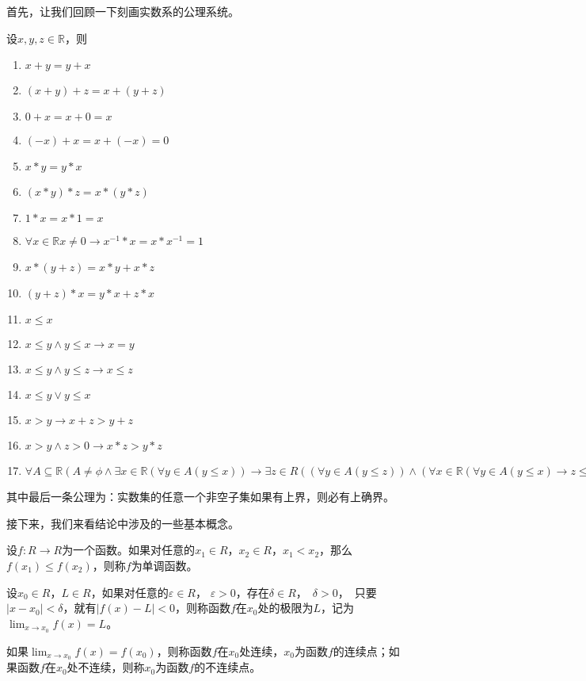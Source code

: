 

首先，让我们回顾一下刻画实数系的公理系统。

     设$x, y, z \in \mathbb{R}$，则
   \begin{enumerate}
   \item   $x + y = y + x$
   \item   $(x + y) + z = x + (y + z)$
   \item   $0 + x = x + 0 = x$
   \item   $(-x) + x = x + (-x) = 0$
   \item   $x * y = y * x$
   \item   $(x * y) * z = x * (y *z)$
   \item   $1 * x = x * 1 = x$
   \item   $\forall x \in \mathbb{R} x \neq 0 \to x^{-1} * x = x * x^{-1} = 1$
   \item   $x* (y + z) = x * y + x * z$
   \item   $(y + z) * x = y * x + z * x$
       \item $x \leq x$
   \item $ x \leq y \land y \leq x \rightarrow x = y$
   \item $x \leq y \land y \leq z \rightarrow x \leq z$
   \item $x \leq y \lor y \leq x$ 
\item $x > y \rightarrow x + z > y + z$
\item $x > y \land z >0 \rightarrow x * z > y * z$
\item   $\forall A \subseteq \mathbb{R} (A \neq \phi \land \exists x \in \mathbb{R} (\forall y \in A (y \leq x)) \rightarrow \exists z \in R ((\forall y \in A (y \leq z) )\land ( \forall x \in \mathbb{R} (\forall y \in A (y \leq x) \rightarrow z \leq x))))$   
    \end{enumerate}

其中最后一条公理为：实数集的任意一个非空子集如果有上界，则必有上确界。

接下来，我们来看结论中涉及的一些基本概念。

设$f:R\to R$为一个函数。如果对任意的$x_1\in R$，$x_2\in R$，$x_1< x_2$，那么$f(x_1) \leq f(x_2)$，则称$f$为单调函数。

设$x_0\in R$，$L\in R$，如果对任意的$\varepsilon\in R$， $\varepsilon> 0$，存在$\delta \in R$，　$\delta > 0$，　只要$|x-x_0|<\delta$，就有$|f(x) - L|<0$，则称函数$f$在$x_0$处的极限为$L$，记为$\lim_{x\to x_0}f(x)=L$。

如果$\lim_{x\to x_0}f(x)=f(x_0)$，则称函数$f$在$x_0$处连续，$x_0$为函数$f$的连续点；如果函数$f$在$x_0$处不连续，则称$x_0$为函数$f$的不连续点。

